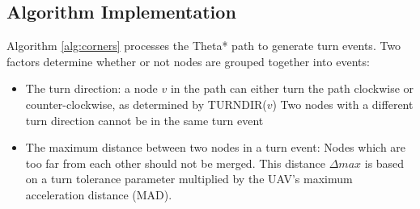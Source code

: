 
\subsection{Algorithm Implementation}
Algorithm \ref{alg:corners} processes the Theta* path to generate turn events. Two factors determine whether or not nodes are grouped together into events:
\begin{itemize}
\item The turn direction: a node $v$ in the path can either turn the path clockwise or counter-clockwise, as determined by TURNDIR($v$) Two nodes with a different turn direction cannot be in the same turn event
\item The maximum distance between two nodes in a turn event: Nodes which are too far from each other should not be merged. This distance $\Delta max$ is based on a turn tolerance parameter multiplied by the UAV's maximum acceleration distance (MAD). 
\end{itemize}



